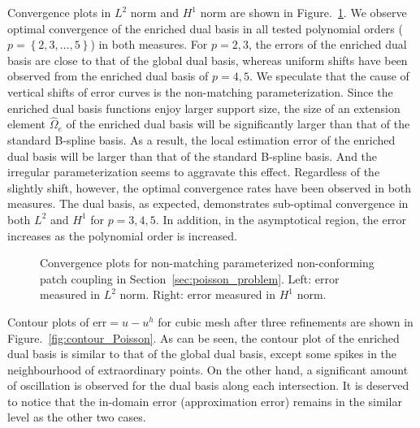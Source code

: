 Convergence plots in $L^2$ norm and $H^1$ norm are shown in Figure.~\ref{fig:Poisson_convergence}. We observe optimal convergence of the enriched dual basis in all tested polynomial orders ($p=\left\{2,3,\dots,5\right\}$) in both measures. For $p=2,3$, the errors of the enriched dual basis are close to that of the global dual basis, whereas uniform shifts have been observed from the enriched dual basis of $p=4,5$. We speculate that the cause of vertical shifts of error curves is the non-matching parameterization. Since the enriched dual basis functions enjoy larger support size, the size of an extension element $\hat{\Omega}_e$ of the enriched dual basis will be significantly larger than that of the standard B-spline basis. As a result, the local estimation error of the enriched dual basis will be larger than that of the standard B-spline basis. And the irregular parameterization seems to aggravate this effect. Regardless of the slightly shift, however, the optimal convergence rates have been observed in both measures. The \Bezier dual basis, as expected, demonstrates sub-optimal convergence in both $L^2$ and $H^1$ for $p=3,4,5$. In addition, in the asymptotical region, the error increases as the polynomial order is increased.\par

\begin{figure}[ht]
	\center
	\captionsetup[subfigure]{labelformat=empty}
	\begin{subfigure}{.45\linewidth}
		\center
		
	\end{subfigure}\hspace{2mm}
	\begin{subfigure}{.45\linewidth}
		\center
		
	\end{subfigure}
	\caption{Convergence plots for non-matching parameterized non-conforming patch coupling in Section~\ref{sec:poisson_problem}. Left: error measured in $L^2$ norm. Right: error measured in $H^1$ norm.}\label{fig:Poisson_convergence}
\end{figure}

Contour plots of $\text{err} = u-u^h$ for cubic mesh after three refinements are shown in Figure.~\ref{fig:contour_Poisson}. As can be seen, the contour plot of the enriched dual basis is similar to that of the global dual basis, except some spikes in the neighbourhood of extraordinary points. On the other hand, a significant amount of oscillation is observed for the \Bezier dual basis along each intersection. It is deserved to notice that the in-domain error (approximation error) remains in the similar level as the other two cases.

